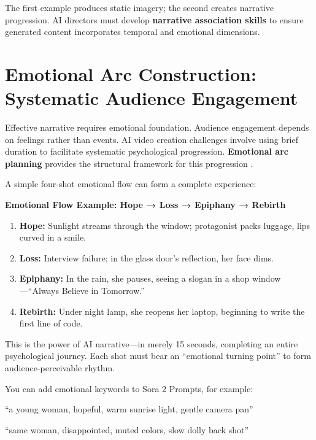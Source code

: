 The first example produces static imagery; the second creates narrative progression. AI directors must develop \textbf{narrative association skills} to ensure generated content incorporates temporal and emotional dimensions.

\section{Emotional Arc Construction: Systematic Audience Engagement}
\label{sec:emotional-arc}

Effective narrative requires emotional foundation. Audience engagement depends on feelings rather than events. AI video creation challenges involve using brief duration to facilitate systematic psychological progression. \textbf{Emotional arc planning} provides the structural framework for this progression \citep{loschky2019scene}.

A simple four-shot emotional flow can form a complete experience:

\textbf{Emotional Flow Example: Hope → Loss → Epiphany → Rebirth}

\begin{enumerate}
\item \textbf{Hope:} Sunlight streams through the window; protagonist packs luggage, lips curved in a smile.

\item \textbf{Loss:} Interview failure; in the glass door's reflection, her face dims.

\item \textbf{Epiphany:} In the rain, she pauses, seeing a slogan in a shop window—``Always Believe in Tomorrow.''

\item \textbf{Rebirth:} Under night lamp, she reopens her laptop, beginning to write the first line of code.
\end{enumerate}

This is the power of AI narrative—in merely 15 seconds, completing an entire psychological journey. Each shot must bear an ``emotional turning point'' to form audience-perceivable rhythm.

You can add emotional keywords to Sora 2 Prompts, for example:

\begin{Prompt}
``a young woman, hopeful, warm sunrise light, gentle camera pan''

``same woman, disappointed, muted colors, slow dolly back shot''
\end{Prompt}

